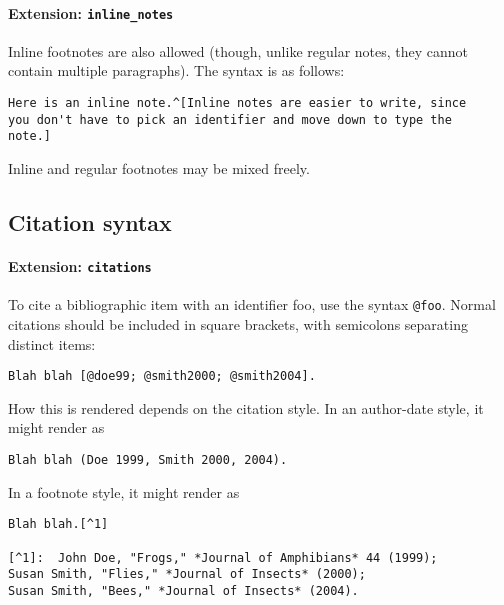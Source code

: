 \documentclass[
]{article}
\begin{document}
\paragraph{\texorpdfstring{Extension:
\texttt{inline\_notes}}{Extension: inline\_notes}}\label{extension-inline_notes}

Inline footnotes are also allowed (though, unlike regular notes, they
cannot contain multiple paragraphs). The syntax is as follows:

\begin{verbatim}
Here is an inline note.^[Inline notes are easier to write, since
you don't have to pick an identifier and move down to type the
note.]
\end{verbatim}

Inline and regular footnotes may be mixed freely.

\subsection{Citation syntax}\label{citation-syntax}

\paragraph{\texorpdfstring{Extension:
\texttt{citations}}{Extension: citations}}\label{extension-citations}

To cite a bibliographic item with an identifier foo, use the syntax
\texttt{@foo}. Normal citations should be included in square brackets,
with semicolons separating distinct items:

\begin{verbatim}
Blah blah [@doe99; @smith2000; @smith2004].
\end{verbatim}

How this is rendered depends on the citation style. In an author-date
style, it might render as

\begin{verbatim}
Blah blah (Doe 1999, Smith 2000, 2004).
\end{verbatim}

In a footnote style, it might render as

\begin{verbatim}
Blah blah.[^1]

[^1]:  John Doe, "Frogs," *Journal of Amphibians* 44 (1999);
Susan Smith, "Flies," *Journal of Insects* (2000);
Susan Smith, "Bees," *Journal of Insects* (2004).
\end{verbatim}
\end{document}
